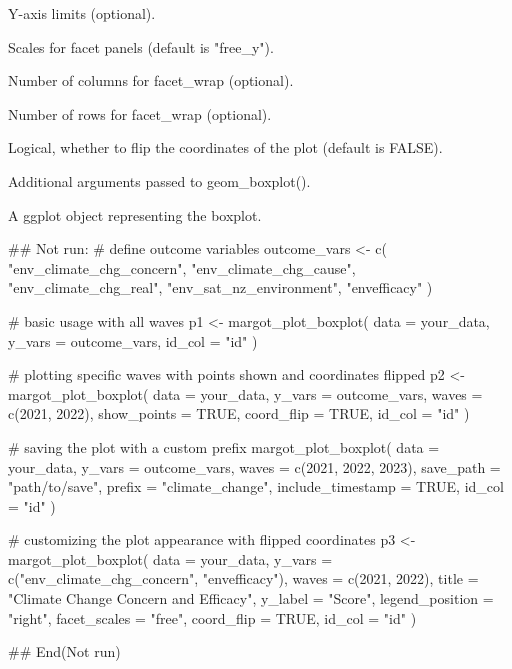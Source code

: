 \documentclass[a4paper]{book}
\begin{document}
\begin{Arguments}
\begin{ldescription}
\item[\code{y\_limits}] Y-axis limits (optional).

\item[\code{facet\_scales}] Scales for facet panels (default is "free\_y").

\item[\code{facet\_ncol}] Number of columns for facet\_wrap (optional).

\item[\code{facet\_nrow}] Number of rows for facet\_wrap (optional).

\item[\code{coord\_flip}] Logical, whether to flip the coordinates of the plot (default is FALSE).

\item[\code{...}] Additional arguments passed to geom\_boxplot().
\end{ldescription}
\end{Arguments}
%
\begin{Value}
A ggplot object representing the boxplot.
\end{Value}
%
\begin{Examples}
\begin{ExampleCode}
## Not run: 
# define outcome variables
outcome_vars <- c(
  "env_climate_chg_concern",
  "env_climate_chg_cause",
  "env_climate_chg_real",
  "env_sat_nz_environment",
  "envefficacy"
)

# basic usage with all waves
p1 <- margot_plot_boxplot(
  data = your_data,
  y_vars = outcome_vars,
  id_col = "id"
)

# plotting specific waves with points shown and coordinates flipped
p2 <- margot_plot_boxplot(
  data = your_data,
  y_vars = outcome_vars,
  waves = c(2021, 2022),
  show_points = TRUE,
  coord_flip = TRUE,
  id_col = "id"
)

# saving the plot with a custom prefix
margot_plot_boxplot(
  data = your_data,
  y_vars = outcome_vars,
  waves = c(2021, 2022, 2023),
  save_path = "path/to/save",
  prefix = "climate_change",
  include_timestamp = TRUE,
  id_col = "id"
)

# customizing the plot appearance with flipped coordinates
p3 <- margot_plot_boxplot(
  data = your_data,
  y_vars = c("env_climate_chg_concern", "envefficacy"),
  waves = c(2021, 2022),
  title = "Climate Change Concern and Efficacy",
  y_label = "Score",
  legend_position = "right",
  facet_scales = "free",
  coord_flip = TRUE,
  id_col = "id"
)

## End(Not run)

\end{ExampleCode}
\end{Examples}
\end{document}
